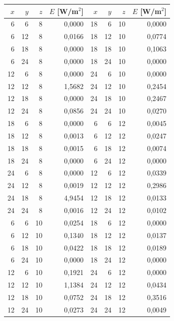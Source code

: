 \begin{tabular}{rrrr|rrrr}
\toprule
$x$ & $y$ & $z$ & $E$ [W/m$^2$] & $x$ & $y$ & $z$ & $E$ [W/m$^2$] \\
\midrule
6 & 6 & 8 & 0,0000 & 18 & 6 & 10 & 0,0000 \\
6 & 12 & 8 & 0,0166 & 18 & 12 & 10 & 0,0774 \\
6 & 18 & 8 & 0,0000 & 18 & 18 & 10 & 0,1063 \\
6 & 24 & 8 & 0,0000 & 18 & 24 & 10 & 0,0000 \\
12 & 6 & 8 & 0,0000 & 24 & 6 & 10 & 0,0000 \\
12 & 12 & 8 & 1,5682 & 24 & 12 & 10 & 0,2454 \\
12 & 18 & 8 & 0,0000 & 24 & 18 & 10 & 0,2467 \\
12 & 24 & 8 & 0,0856 & 24 & 24 & 10 & 0,0270 \\
18 & 6 & 8 & 0,0000 & 6 & 6 & 12 & 0,0045 \\
18 & 12 & 8 & 0,0013 & 6 & 12 & 12 & 0,0247 \\
18 & 18 & 8 & 0,0015 & 6 & 18 & 12 & 0,0074 \\
18 & 24 & 8 & 0,0000 & 6 & 24 & 12 & 0,0000 \\
24 & 6 & 8 & 0,0000 & 12 & 6 & 12 & 0,0339 \\
24 & 12 & 8 & 0,0019 & 12 & 12 & 12 & 0,2986 \\
24 & 18 & 8 & 4,9454 & 12 & 18 & 12 & 0,0133 \\
24 & 24 & 8 & 0,0016 & 12 & 24 & 12 & 0,0102 \\
6 & 6 & 10 & 0,0254 & 18 & 6 & 12 & 0,0000 \\
6 & 12 & 10 & 0,1340 & 18 & 12 & 12 & 0,0137 \\
6 & 18 & 10 & 0,0422 & 18 & 18 & 12 & 0,0189 \\
6 & 24 & 10 & 0,0000 & 18 & 24 & 12 & 0,0000 \\
12 & 6 & 10 & 0,1921 & 24 & 6 & 12 & 0,0000 \\
12 & 12 & 10 & 1,1384 & 24 & 12 & 12 & 0,0434 \\
12 & 18 & 10 & 0,0752 & 24 & 18 & 12 & 0,3516 \\
12 & 24 & 10 & 0,0273 & 24 & 24 & 12 & 0,0049 \\
\bottomrule
\end{tabular}
